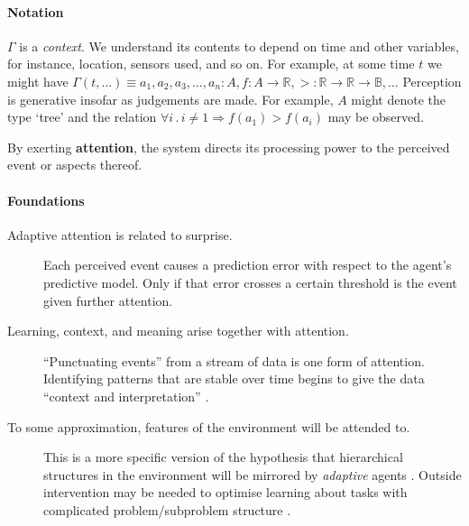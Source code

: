 \paragraph{\textbf{\upshape Notation}}

$\Gamma$ is a \emph{context}.  We understand its contents to depend on
time and other variables, for instance, location, sensors used, and so
on.  For example, at some time $t$ we might have $\Gamma(t,\ldots)
\equiv a_1, a_2, a_3, \ldots, a_n : A, f:A\rightarrow \mathbb{R},
>:\mathbb{R}\rightarrow\mathbb{R}\rightarrow \mathbb{B}, \ldots$
Perception is generative insofar as judgements are made.  For example,
$A$ might denote the type `tree' and the relation $\forall i
\mathbin{.} i\neq 1 \Rightarrow f(a_1)>f(a_i)$ may be observed.


\begin{defn}\label{def:attention}
\hypertarget{def:attention}{}By exerting \textbf{attention}, the system directs its processing power to the perceived event or aspects thereof.
\end{defn}

\paragraph{\textbf{\upshape Foundations}}

\begin{description}
\item[Adaptive attention is related to surprise.] Each perceived event causes a prediction error with respect to the agent's predictive model. Only if that error crosses a certain threshold is the event given further attention.
\item[Learning, context, and meaning arise together with attention.]
  ``Punctuating events'' \cite[p.~301]{bateson-logical-categories}
  from a stream of data is one form of attention.  Identifying
  patterns that are stable over time begins to give the data
  ``context and interpretation'' \cite{rowley2007wisdom}.
\item[To some approximation, features of the environment will be attended to.] This is a more specific version of the hypothesis
  that hierarchical structures in the environment will be mirrored by
  \emph{adaptive} agents \cite{simon1962architecture,simon1995near}.
  Outside intervention may be needed to optimise learning about tasks
  with complicated problem/subproblem structure
  \cite{goldenberg2004may}.
\end{description}

